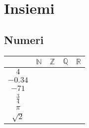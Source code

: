 \section{Insiemi}
\subsection{Numeri}
\begin{questions}

\begin{qblock}
	\question
	
	
		\begin{multicols}{2}
			\begin{tabular}{|c|c|c|c|c|}
				\hline
				& $ \mathbb{N}$ & $ \mathbb{Z}  $ & $ \mathbb{Q}$ & $ \mathbb{R} $ \\
				\hline
				$ 4 $      &      \solonly{\checkmark }         &  \solonly{\checkmark }                &    \solonly{\checkmark }            &    \solonly{\checkmark }             \\
				\hline
				$ -0.34 $    &               &                 &    \solonly{\checkmark }            &      \solonly{\checkmark }           \\
				\hline
				$ -71 $     &               &      \solonly{\checkmark }            &    \solonly{\checkmark }            &   \solonly{\checkmark }              \\
				\hline
				$ \frac{3}{4} $ &               &                 &     \solonly{\checkmark }           &        \solonly{\checkmark }         \\
				\hline
				$ \pi $     &               &                 &               &    \solonly{\checkmark }             \\
				\hline
				$ \sqrt{2} $   &               &                 &               &    \solonly{\checkmark }             \\
				\hline
			\end{tabular}
			

\end{multicols}
\end{qblock}
\end{questions}

